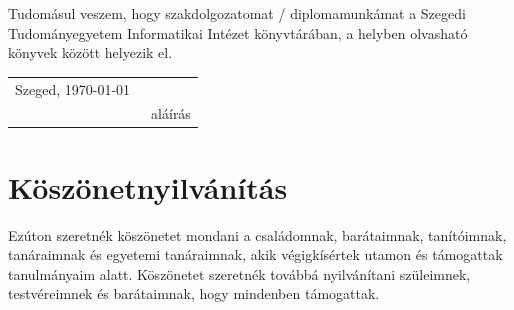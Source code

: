 \documentclass[12pt]{report}
\theoremstyle{definition}
\begin{document}
Tudomásul veszem, hogy szakdolgozatomat / diplomamunkámat a Szegedi Tudományegyetem Informatikai Intézet könyvtárában, a helyben olvasható könyvek között helyezik el.

\vspace*{2cm}

\begin{tabular}{lc}
	Szeged, \today\
	\hspace{2cm} & \makebox[6cm]{\dotfill} \\
	             & aláírás              \\
\end{tabular}


\vspace*{4cm}











\chapter*{Köszönetnyilvánítás}

Ezúton szeretnék köszönetet mondani a családomnak, barátaimnak, tanítóimnak, tanáraimnak és egyetemi tanáraimnak, akik végigkísértek utamon és támogattak tanulmányaim alatt. Köszönetet szeretnék továbbá nyilvánítani szüleimnek, testvéreimnek és barátaimnak, hogy mindenben támogattak.
\end{document}
